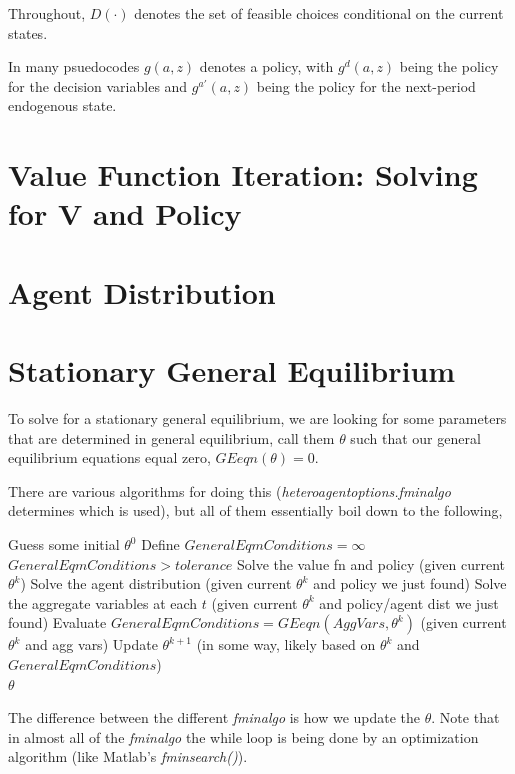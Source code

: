 \documentclass[11pt,fleqn]{article}
\begin{document}
Throughout, $D(\cdot)$ denotes the set of feasible choices conditional on the current states.

In many psuedocodes $g(a,z)$ denotes a policy, with $g^d(a,z)$ being the policy for the decision variables and $g^{a'}(a,z)$ being the policy for the next-period endogenous state.

\section{Value Function Iteration: Solving for V and Policy}





\section{Agent Distribution}






\section{Stationary General Equilibrium}
To solve for a stationary general equilibrium, we are looking for some parameters that are determined in general equilibrium, call them $\theta$ such that our general equilibrium equations equal zero, $GEeqn(\theta)=0$.

There are various algorithms for doing this (\textit{heteroagentoptions.fminalgo} determines which is used), but all of them essentially boil down to the following,
\begin{algorithmic}
 \State Guess some initial $\theta^0$
 \State Define $GeneralEqmConditions=\infty$
 \While $GeneralEqmConditions>tolerance$
 \State Solve the value fn and policy (given current $\theta^k$)
 \State Solve the agent distribution (given current $\theta^k$ and policy we just found)
 \State Solve the aggregate variables at each $t$ (given current $\theta^k$ and policy/agent dist we just found)
 \State Evaluate $GeneralEqmConditions=GEeqn(AggVars,\theta^k)$ (given current $\theta^k$ and agg vars)
 \State Update $\theta^{k+1}$ (in some way, likely based on $\theta^k$ and $GeneralEqmConditions$)
 \EndWhile
 \\ \Return $\theta$
\end{algorithmic}
The difference between the different \textit{fminalgo} is how we update the $\theta$. Note that in almost all of the \textit{fminalgo} the while loop is being done by an optimization algorithm (like Matlab's \textit{fminsearch()}).
\end{document}
